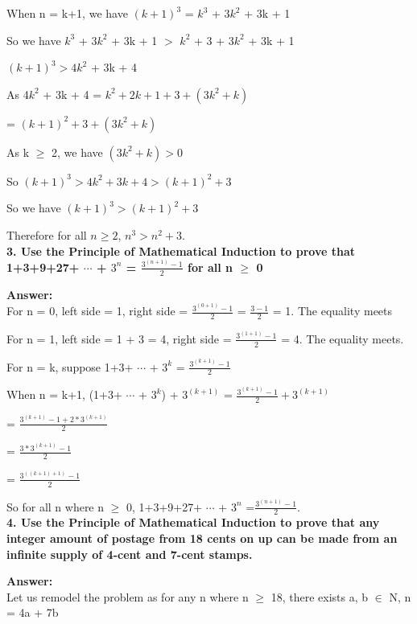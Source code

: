 \documentclass{article}
\begin{document}
\begin{large}
When n = k+1, we have $(k+1)^3$ = $k^3$ + 3$k^2$ + 3k + 1

So we have  $k^{3}$ + 3$k^2$ + 3k + 1 $>$ $k^{2}$ + 3 + 3$k^2$ + 3k + 1

\indent\indent \indent        $(k+1)^3 > 4k^2$ + 3k + 4

As 4$k^2$ + 3k + 4 = $k^2 + 2k + 1 + 3 + (3k^2 + k)$

\indent\indent \indent                  = $(k+1)^2 + 3 + (3k^2 + k)$
                   
As k $\ge$ 2, we have $(3k^2 + k) > 0 $

So $(k+1)^3 > 4k^2 + 3k + 4 > (k+1)^2 + 3$

So we have $(k+1)^3 > (k+1)^2 + 3$

Therefore for all $n\ge 2$, $n^{3}>n^{2}+3$.\\

\textbf{3. Use the Principle of Mathematical Induction to prove that 1+3+9+27+ $\cdots$ + $3^n$ = $\frac{3^(n+1)-1}{2}$ for all n $\ge$ 0}

\textbf{Answer:}\\


For n = 0, left side = 1, right side = $\frac{3^(0+1)-1}{2}$ = $\frac{3-1}{2}$ = 1. The equality meets

For n = 1, left side = 1 + 3 = 4, right side = $\frac{3^(1+1)-1}{2}$ = 4. The equality meets.

For n = k, suppose 1+3+ $\cdots$ + $3^k$ = $\frac{3^(k+1)-1}{2}$

When n = k+1, (1+3+ $\cdots$ + $3^k$) + $3^(k+1)$ = $\frac{3^(k+1)-1}{2} + 3^(k+1)$

 \indent\indent           = $\frac{3^(k+1)-1+2*3^(k+1)}{2}$
            
  \indent\indent          = $\frac{3*3^(k+1)-1}{2}$
            
   \indent\indent         = $\frac{3^((k+1)+1)-1}{2}$
            
So for all n where n $\ge$ 0, 1+3+9+27+ $\cdots$ + $3^n$ =$\frac{3^(n+1)-1}{2}.$\\

\textbf{4. Use the Principle of Mathematical Induction to prove that any integer amount of postage from 18 cents on up can be made from an infinite supply of 4-cent and 7-cent stamps.}

\textbf{Answer:}\\


Let us remodel the problem as for any n where n $\ge$ 18, there exists a, b $\in$ N, n = 4a + 7b


\end{large}
\end{document}
